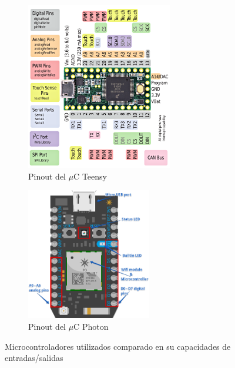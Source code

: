 \begin{figure}[H]
    \begin{subfigure}[t]{0.5\textwidth}
        \centering
        \includegraphics[width=0.7\textwidth]{fig/circuito/teensy32_front_pinout}
        \caption{Pinout del $\mu$C Teensy}
        \label{fig:circuito/teensy}
    \end{subfigure}
    \begin{subfigure}[t]{0.5\textwidth}
        \centering
        \includegraphics[width=0.6\textwidth]{fig/circuito/photon}
        \caption{Pinout del $\mu$C Photon}
        \label{fig:circuito/photon}
    \end{subfigure}
    \caption{Microcontroladores utilizados comparado en su capacidades de entradas/salidas}
\end{figure}

